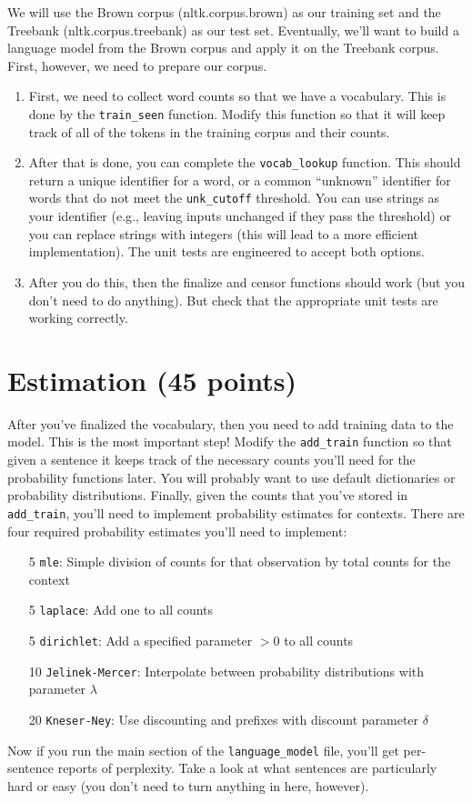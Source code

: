\documentclass[11pt]{article}
\begin{document}
We will use the Brown corpus (nltk.corpus.brown) as our training set and the Treebank (nltk.corpus.treebank) as our test set.  Eventually, we'll want to build a language model from the Brown corpus and apply it on the Treebank corpus.  First, however, we need to prepare our corpus.
\begin{enumerate}
\item First, we need to collect word counts so that we have a vocabulary.  This is done by the \texttt{train\_seen} function.  Modify this function so that it will keep track of all of the tokens in the training corpus and their counts.
\item After that is done, you can complete the \texttt{vocab\_lookup} function.  This should return a unique identifier for a word, or a common ``unknown'' identifier for words that do not meet the \texttt{unk\_cutoff} threshold.  You can use strings as your identifier (e.g., leaving inputs unchanged if they pass the threshold) or you can replace strings with integers (this will lead to a more efficient implementation).  The unit tests are engineered to accept both options.
\item After you do this, then the finalize and censor functions should work (but you don't need to do anything).  But check that the appropriate unit tests are working correctly.
\end{enumerate}

\section{Estimation (45 points)}

After you've finalized the vocabulary, then you need to add training data to the model.  This is the most important step!  Modify the \texttt{add\_train} function so that given a sentence it keeps track of the necessary counts you'll need for the probability functions later.  You will probably want to use default dictionaries or probability distributions.  Finally, given the counts that you've stored in \texttt{add\_train}, you'll need to implement probability estimates for contexts.  There are four required probability estimates you'll need to implement:
\begin{itemize}
\item[5] \texttt{mle}: Simple division of counts for that observation by total counts for the context
\item[5] \texttt{laplace}: Add one to all counts
\item[5] \texttt{dirichlet}: Add a specified parameter $> 0$ to all counts
\item[10] \texttt{Jelinek-Mercer}: Interpolate between probability distributions with parameter $\lambda$
\item[20] \texttt{Kneser-Ney}: Use discounting and prefixes with discount parameter $\delta$ 
\end{itemize}
Now if you run the main section of the \texttt{language\_model} file, you'll get per-sentence reports of perplexity.  Take a look at what sentences are particularly hard or easy (you don't need to turn anything in here, however).
\end{document}
